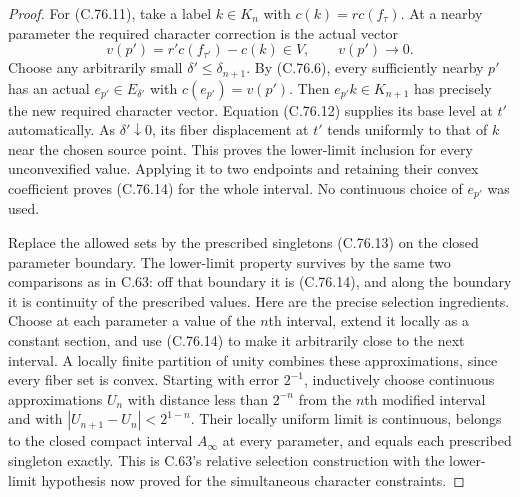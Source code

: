 \begin{proof}
For (C.76.11), take a label $k\in K_n$ with
$c(k)=r c(f_\tau)$. At a nearby parameter the required
character correction is the actual vector
\[
        v(p')=r'c(f_{\tau'})-c(k)\in V,
                              \qquad v(p')\longrightarrow0.
                                                               \tag{C.76.15}
\]
Choose any arbitrarily small $\delta'\leq\delta_{n+1}$.
By (C.76.6), every sufficiently nearby $p'$ has an actual
$e_{p'}\in E_{\delta'}$ with $c(e_{p'})=v(p')$.
Then $e_{p'}k\in K_{n+1}$ has precisely the new required
character vector. Equation (C.76.12) supplies its base
level at $t'$ automatically. As $\delta'\downarrow0$,
its fiber displacement at $t'$ tends uniformly to that
of $k$ near the chosen source point. This proves the
lower-limit inclusion for every unconvexified value.
Applying it to two endpoints and retaining their convex
coefficient proves (C.76.14) for the whole interval.
No continuous choice of $e_{p'}$ was used.

Replace the allowed sets by the prescribed singletons
(C.76.13) on the closed parameter boundary. The
lower-limit property survives by the same two comparisons
as in C.63: off that boundary it is (C.76.14), and along
the boundary it is continuity of the prescribed values.
Here are the precise selection ingredients. Choose at
each parameter a value of the $n$th interval, extend it
locally as a constant section, and use (C.76.14) to make
it arbitrarily close to the next interval. A locally
finite partition of unity combines these approximations,
since every fiber set is convex. Starting with error
$2^{-1}$, inductively choose continuous approximations
$U_n$ with distance less than $2^{-n}$ from the $n$th
modified interval and with
$|U_{n+1}-U_n|<2^{1-n}$. Their locally uniform limit is
continuous, belongs to the closed compact interval
$A_\infty$ at every parameter, and equals each prescribed
singleton exactly. This is C.63's relative selection
construction with the lower-limit hypothesis now proved
for the simultaneous character constraints.


\end{proof}
